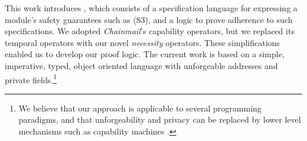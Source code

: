 This work introduces \Nec, which consists of a specification language for expressing a module's safety guarantees such as (S3), and a logic 
to prove adherence to such specifications.
We adopted %
\emph{Chainmail}'s %
  capability operators, 
but we replaced its temporal operators with  {our novel}
  \emph{necessity} operators. 
  These simplifications enabled us to develop our proof logic. 
The current work is based on a simple, imperative, typed, object oriented
language with unforgeable addresses and private fields.\footnote{We believe
 that our approach is applicable to several programming paradigms, and 
 that   unforgeability and privacy
 can be replaced 
 by lower level mechanisms such as capability machines \cite{vanproving,davis2019cheriabi}.
  }


 

